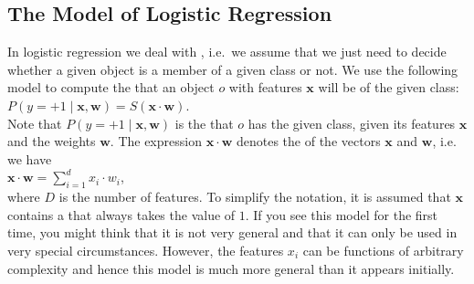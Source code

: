 \subsection{The Model of Logistic Regression}
In logistic regression we deal with , 
i.e.~we assume that we just need to decide
whether a given object is a member of a given class or not.  We use the following model to compute the  that an
object $o$ with features $\mathbf{x}$ will be of the given class: 
\\[0.2cm]
\hspace*{1.3cm}
$P(y=+1\;|\;\mathbf{x},\mathbf{w}) = S(\mathbf{x} \cdot \mathbf{w})$.
\\[0.2cm]
Note that $P(y=+1\;|\;\mathbf{x},\mathbf{w})$ is the  that $o$ has the given
class, given its features $\mathbf{x}$ and the weights $\mathbf{w}$.  The expression $\mathbf{x}
\cdot \mathbf{w}$ denotes the  of the vectors $\mathbf{x}$ and $\mathbf{w}$,  
i.e. we have
\\[0.2cm]
\hspace*{1.3cm}
$\mathbf{x} \cdot \mathbf{w} = \sum\limits_{i=1}^d x_i \cdot w_i$,
\\[0.2cm]
where $D$ is the number of features.
To simplify the notation, it is assumed that $\mathbf{x}$ contains a  
that always takes the value of $1$.
If you see this model for the first time, you might think that it is not very general and that it can only be
used in very special circumstances.  However,  the features $x_i$ can be functions of arbitrary complexity
and hence this model is much more general than it appears initially.

